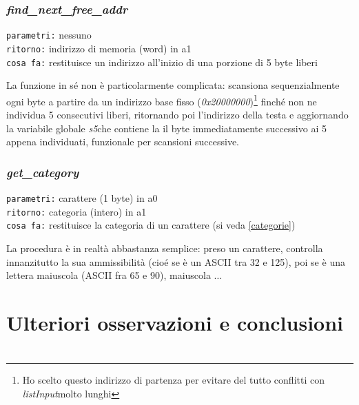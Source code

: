 \documentclass[11pt]{report}
\begin{document}
    \subsection{\textit{find\_next\_free\_addr}}

    \begin{mdframed}
            \texttt{parametri:} nessuno \\
             \texttt{ritorno:} indirizzo di memoria (word) in a1\\
             \texttt{cosa fa:} restituisce un indirizzo all'inizio di una porzione di 5 byte liberi
        \end{mdframed}

        La funzione in sé non è particolarmente complicata: scansiona sequenzialmente ogni byte a partire da un indirizzo base fisso (\textit{0x20000000})\footnote[1]{Ho scelto questo indirizzo di partenza per evitare del tutto conflitti con \textit{listInput}molto lunghi} finché non ne individua 5 consecutivi liberi, ritornando poi l'indirizzo della testa e aggiornando la variabile globale \textit{s5}che contiene la il byte immediatamente successivo ai 5 appena individuati, funzionale per scansioni successive. 
        
    \subsection{\textit{get\_category}}

    \begin{mdframed}
            \texttt{parametri:} carattere (1 byte) in a0 \\
             \texttt{ritorno:} categoria (intero) in a1 \\
             \texttt{cosa fa:} restituisce la categoria di un carattere \small(si veda \ref{categorie})
        \end{mdframed}

        La procedura è in realtà abbastanza semplice: preso un carattere, controlla innanzitutto la sua ammissibilità (cioé se è un ASCII tra 32 e 125), poi se è una lettera maiuscola (ASCII fra 65 e 90), maiuscola $\ldots$ \\


    \chapter{Ulteriori osservazioni e conclusioni}
    \chapter{}
    
    
    
    
\end{document}
